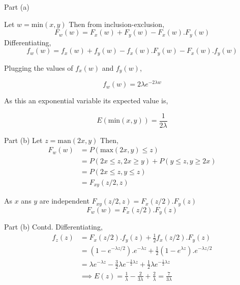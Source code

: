 \documentclass{beamer}
\begin{document}
\begin{frame}{Part (a)}

    Let $w = \text{min}(x,y)$
    Then from inclusion-exclusion,
    \begin{equation}
        F_w(w) = F_x(w) + F_y(w) - F_x(w).F_y(w)
    \end{equation}
    Differentiating,
    \begin{equation}
        f_w(w) = f_x(w) + f_y(w) - f_x(w).F_y(w) - F_x(w).f_y(w)
    \end{equation}
    
    Plugging the values of $f_x(w)$ and $f_y(w)$,
    
    \begin{equation}
        f_w(w) = 2\lambda e^{-2\lambda w}
    \end{equation}
    
    As this an exponential variable its expected value is,
    
    \begin{equation}
        E(\text{min}(x,y)) = \frac{1}{2\lambda}
    \end{equation}
    
\end{frame} 

\begin{frame}{Part (b)}
    Let $z = \text{man}(2x,y)$
    Then,
    \begin{align}
        F_w(w) &= P(\text{max}(2x, y) \leq z) \\
        &= P(2x \leq z, 2x \geq y) + P(y \leq z, y \geq 2x) \\
        &= P(2x \leq z, y \leq z) \\
        &= F_{xy}(z/2 , z)
    \end{align}
    
    As $x$ ans $y$ are independent $F_{xy}(z/2 , z) = F_x(z/2).F_y(z)$
    \begin{equation}
        F_w(w) = F_x(z/2).F_y(z)
    \end{equation}
\end{frame}

\begin{frame}{Part (b) Contd.}
    Differentiating, 
    \begin{align}
        f_z(z) &= F_x(z/2).f_y(z) + \frac{1}{2} f_x(z/2).F_y(z)\\
        &= \left(1 - e^{-\lambda z/2} \right).e^{-\lambda z} + \frac{1}{2}\left(1 - e^{\lambda z} \right).e^{-\lambda z/2}\\
        &= \lambda e^{-\lambda z} - \frac{3}{2}\lambda e^{-\frac{3}{2}\lambda z} + \frac{1}{2}\lambda e^{-\frac{1}{2}\lambda z} \\
        &\implies E(z) = \frac{1}{\lambda} - \frac{2}{3\lambda} + \frac{2}{\lambda} = \frac{7}{3\lambda}
    \end{align}
\end{frame}
\end{document}
